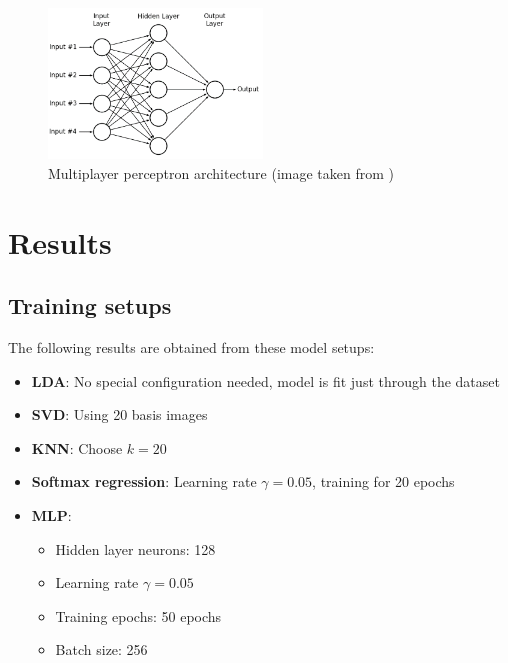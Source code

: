 \documentclass[12,]{article}
\providecommand{\tightlist}{%
  \setlength{\itemsep}{0pt}\setlength{\parskip}{0pt}}
\begin{document}
\begin{figure}
  \begin{center}
  \includegraphics[width=0.5\columnwidth, height=4cm]{./Multilayer-Perceptron-Network.png}
  \end{center}
\caption{Multiplayer perceptron architecture (image taken from \cite{mlp-img})}
\end{figure}

\hypertarget{results}{%
\section{Results}\label{results}}

\hypertarget{training-setups}{%
\subsection{Training setups}\label{training-setups}}

The following results are obtained from these model setups:

\begin{itemize}
\tightlist
\item
  \textbf{LDA}: No special configuration needed, model is fit just
  through the dataset
\item
  \textbf{SVD}: Using 20 basis images
\item
  \textbf{KNN}: Choose \(k = 20\)
\item
  \textbf{Softmax regression}: Learning rate \(\gamma = 0.05\), training
  for 20 epochs
\item
  \textbf{MLP}:

  \begin{itemize}
  \tightlist
  \item
    Hidden layer neurons: 128
  \item
    Learning rate \(\gamma = 0.05\)
  \item
    Training epochs: 50 epochs
  \item
    Batch size: 256
  \end{itemize}
\end{itemize}
\end{document}

